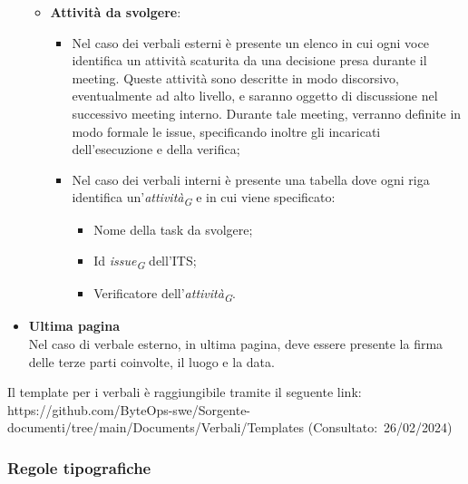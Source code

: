 \begin{itemize}
\begin{itemize}
            \item \textbf{Attività da svolgere}:
            \begin{itemize}
                \item Nel caso dei verbali esterni è presente un elenco in cui ogni voce identifica un attività scaturita da una decisione presa durante il meeting. Queste attività sono descritte in modo discorsivo, eventualmente ad alto livello, e saranno oggetto di discussione nel successivo meeting interno. Durante tale meeting, verranno definite in modo formale le issue, specificando inoltre gli incaricati dell'esecuzione e della verifica;
                \item Nel caso dei verbali interni è presente una tabella dove ogni riga identifica un'\textit{attività}\textsubscript{\textit{G}} e in cui viene specificato:
                    \begin{itemize}
                        \item Nome della task da svolgere;
                        \item Id \textit{issue}\textsubscript{\textit{G}} dell'ITS;
                        \item Verificatore dell'\textit{attività}\textsubscript{\textit{G}}.
                    \end{itemize}
            \end{itemize}
            
        \end{itemize}
    \item \textbf{Ultima pagina} \\
        Nel caso di verbale esterno, in ultima pagina, deve essere presente la firma delle terze parti coinvolte, il luogo e la data.
\end{itemize}

Il template per i verbali è raggiungibile tramite il seguente link: https://github.com/ByteOps-swe/Sorgente-documenti/tree/main/Documents/Verbali/Templates (Consultato:~26/02/2024)

\subsubsection{Regole tipografiche}
